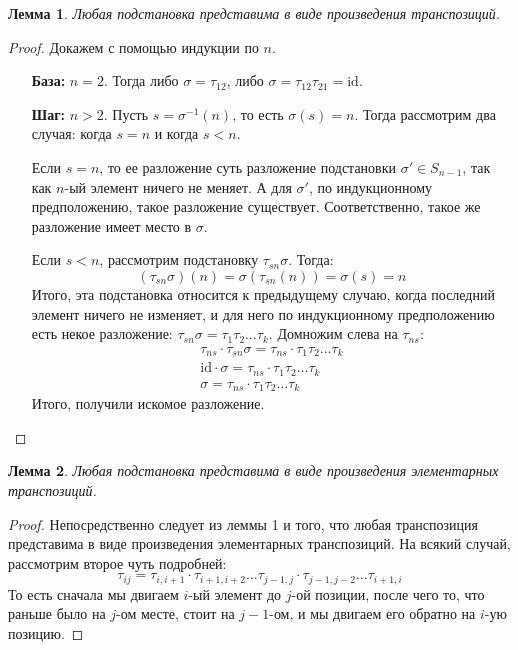 \documentclass[a4paper,12pt]{article}
\newcommand{\id}{\mathrm{id}}
\newtheorem*{lemma}{Лемма}
\begin{document}
	\begin{lemma}
		Любая подстановка представима в виде произведения транспозиций.
	\end{lemma}
	\begin{proof}
		Докажем с помощью индукции по $n$.
		
		\begin{itemize}
			\item[\textbf{База:}] $n=2$. Тогда либо $\sigma = \tau_{12}$, либо $\sigma = \tau_{12}\tau_{21} = \id$.
			\item[\textbf{Шаг:}] $n >  2$. Пусть $s = \sigma^{-1}(n)$, то есть $\sigma(s) = n$. Тогда рассмотрим два случая: когда $s = n$ и когда $s <  n$.
			
			Если $s = n$, то ее разложение суть разложение подстановки $\sigma' \in S_{n-1}$, так как $n$-ый элемент ничего не меняет. А для $\sigma'$, по индукционному предположению, такое разложение существует. Соответственно, такое же разложение имеет место в $\sigma$.
			
			Если $s < n$, рассмотрим подстановку $\tau_{sn}\sigma$. Тогда:
			$$
			(\tau_{sn}\sigma)(n) = \sigma(\tau_{sn}(n)) = \sigma(s) = n
			$$
			Итого, эта подстановка относится к предыдущему случаю, когда последний элемент ничего не изменяет, и для него по индукционному предположению есть некое разложение: $\tau_{sn}\sigma = \tau_1\tau_2\dots\tau_k
			$. Домножим слева на $\tau_{ns}$:
			\begin{gather*}
			\tau_{ns} \cdot \tau_{sn}\sigma = \tau_{ns} \cdot \tau_1\tau_2\dots\tau_k \\
			\id \cdot \sigma = \tau_{ns} \cdot \tau_1\tau_2\dots\tau_k \\
			\sigma = \tau_{ns} \cdot \tau_1\tau_2\dots\tau_k
			\end{gather*}
			Итого, получили искомое разложение.
		\end{itemize}
	\end{proof}
	\begin{lemma}
		Любая подстановка представима в виде произведения элементарных транспозиций.
	\end{lemma}
	\begin{proof}
		Непосредственно следует из леммы 1 и того, что любая транспозиция представима в виде произведения элементарных транспозиций. На всякий случай, рассмотрим второе чуть подробней:
		$$
		\tau_{ij} = \tau_{i, i+1} \cdot  \tau_{i+1, i+2} \dots \tau_{j-1, j} \cdot \tau_{j-1, j-2} \dots \tau_{i+1, i}
		$$
		То есть сначала мы двигаем $i$-ый элемент до $j$-ой позиции, после чего то, что раньше было на $j$-ом месте, стоит на $j-1$-ом, и мы двигаем его обратно на $i$-ую позицию. 
	\end{proof}
\end{document}
